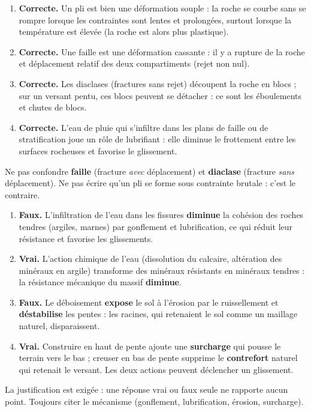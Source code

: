 \documentclass[11pt]{article}
\newcommand{\cle}[1]{{\popxbold\color{popdark}#1}}
\begin{document}
\begin{corrige}
\tcblower
\begin{enumerate}
\item \textbf{Correcte.} Un pli est bien une déformation \cle{souple} : la roche se courbe sans se rompre lorsque les contraintes sont lentes et prolongées, surtout lorsque la température est élevée (la roche est alors plus plastique).
\item \textbf{Correcte.} Une faille est une déformation \cle{cassante} : il y a rupture de la roche et déplacement relatif des deux compartiments (rejet non nul).
\item \textbf{Correcte.} Les diaclases (fractures sans rejet) découpent la roche en blocs ; sur un versant pentu, ces blocs peuvent se détacher : ce sont les éboulements et chutes de blocs.
\item \textbf{Correcte.} L'eau de pluie qui s'infiltre dans les plans de faille ou de stratification joue un rôle de \cle{lubrifiant} : elle diminue le frottement entre les surfaces rocheuses et favorise le glissement.
\end{enumerate}
\end{corrige}
\begin{attention}
Ne pas confondre \textbf{faille} (fracture \emph{avec} déplacement) et \textbf{diaclase} (fracture \emph{sans} déplacement). Ne pas écrire qu'un pli se forme sous contrainte \og brutale \fg{} : c'est le contraire.
\end{attention}

\begin{corrige}
\tcblower
\begin{enumerate}
\item \textbf{Faux.} L'infiltration de l'eau dans les fissures \textbf{diminue} la cohésion des roches tendres (argiles, marnes) par gonflement et lubrification, ce qui réduit leur résistance et favorise les glissements.
\item \textbf{Vrai.} L'action chimique de l'eau (dissolution du calcaire, altération des minéraux en argile) transforme des minéraux résistants en minéraux tendres : la résistance mécanique du massif \textbf{diminue}.
\item \textbf{Faux.} Le déboisement \textbf{expose} le sol à l'érosion par le ruissellement et \textbf{déstabilise} les pentes : les racines, qui retenaient le sol comme un maillage naturel, disparaissent.
\item \textbf{Vrai.} Construire en haut de pente ajoute une \textbf{surcharge} qui pousse le terrain vers le bas ; creuser en bas de pente supprime le \textbf{contrefort} naturel qui retenait le versant. Les deux actions peuvent déclencher un glissement.
\end{enumerate}
\end{corrige}
\begin{attention}
La justification est exigée : une réponse \og vrai \fg{} ou \og faux \fg{} seule ne rapporte aucun point. Toujours citer le mécanisme (gonflement, lubrification, érosion, surcharge).
\end{attention}
\end{document}
